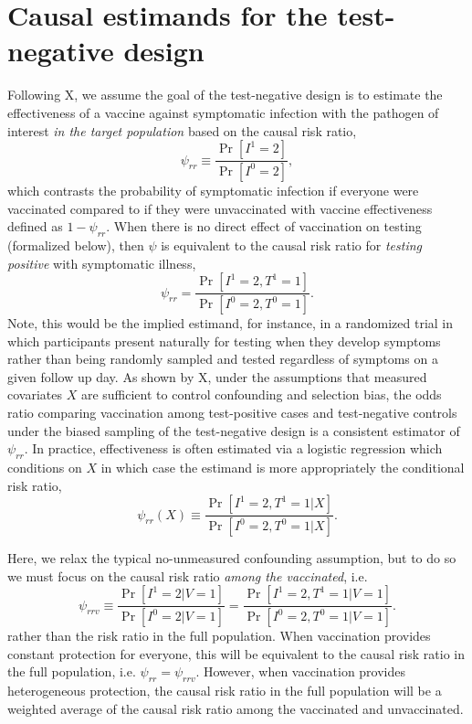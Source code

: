 \documentclass[11pt]{article}
\begin{document}
\section{Causal estimands for the test-negative design} \label{sec:estimands}
Following X, we assume the goal of the test-negative design is to estimate the effectiveness of a vaccine against symptomatic infection with the pathogen of interest \textit{in the target population} based on the causal risk ratio,
\begin{equation*}
    \psi_{rr} \equiv \dfrac{\Pr[I^1 = 2]}{\Pr[I^0 = 2]},
\end{equation*}
which contrasts the probability of symptomatic infection if everyone were vaccinated compared to if they were unvaccinated with vaccine effectiveness defined as $1 - \psi_{rr}$. When there is no direct effect of vaccination on testing (formalized below), then $\psi$ is equivalent to the causal risk ratio for \textit{testing positive} with symptomatic illness,
\begin{equation*}
    \psi_{rr} = \dfrac{\Pr[I^1 = 2, T^1 = 1]}{\Pr[I^0 = 2, T^0 = 1]}.
\end{equation*}
Note, this would be the implied estimand, for instance, in a randomized trial in which participants present naturally for testing when they develop symptoms rather than being randomly sampled and tested regardless of symptoms on a given follow up day. As shown by X, under the assumptions that measured covariates $X$ are sufficient to control confounding and selection bias, the odds ratio comparing vaccination among test-positive cases and test-negative controls under the biased sampling of the test-negative design is a consistent estimator of $\psi_{rr}$. In practice, effectiveness is often estimated via a logistic regression which conditions on $X$ in which case the estimand is more appropriately the conditional risk ratio,
\begin{equation*}
    \psi_{rr}(X) \equiv \dfrac{\Pr[I^1 = 2, T^1 = 1 | X]}{\Pr[I^0 = 2, T^0 = 1 | X]}.
\end{equation*}

Here, we relax the typical no-unmeasured confounding assumption, but to do so we must focus on the causal risk ratio \textit{among the vaccinated}, i.e.
\begin{equation*}
    \psi_{rrv} \equiv \dfrac{\Pr[I^1 = 2 | V = 1]}{\Pr[I^0 = 2 | V = 1]} = \dfrac{\Pr[I^1 = 2, T^1 = 1 | V = 1]}{\Pr[I^0 = 2, T^0 = 1 | V = 1]}.
\end{equation*}
rather than the risk ratio in the full population. When vaccination provides constant protection for everyone, this will be equivalent to the causal risk ratio in the full population, i.e. $\psi_{rr} = \psi_{rrv}$. However, when vaccination provides heterogeneous protection, the causal risk ratio in the full population will be a weighted average of the causal risk ratio among the vaccinated and unvaccinated.
\end{document}
